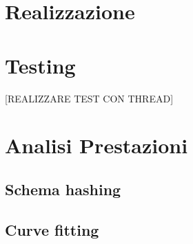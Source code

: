 \section{Realizzazione}


\section{Testing}


	
	[REALIZZARE TEST CON THREAD]

\section{Analisi Prestazioni}

	
	\subsection{Schema hashing}
	
		
	\subsection{Curve fitting}
	
